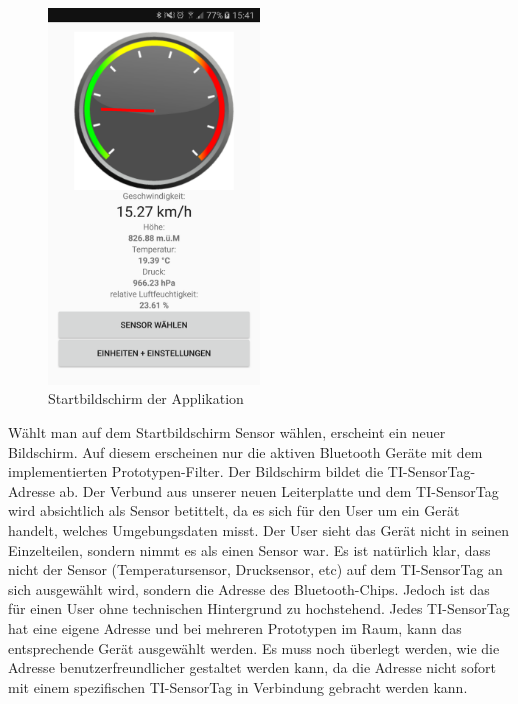 \begin{figure}[ht]
    \includegraphics[width=0.5\textwidth]{4Resultate/imag/APPHomeScreen.png} 
    \caption{Startbildschirm der Applikation}
    \label{tacho}
\end{figure}

Wählt man auf dem Startbildschirm \glqq Sensor wählen\grqq, erscheint ein neuer Bildschirm. Auf diesem erscheinen nur die aktiven Bluetooth Geräte mit dem implementierten Prototypen-Filter. Der Bildschirm bildet die TI-SensorTag-Adresse ab. Der Verbund aus unserer neuen Leiterplatte und dem TI-SensorTag wird absichtlich als Sensor betittelt, da es sich für den User um ein Gerät handelt, welches Umgebungsdaten misst. Der User sieht das Gerät nicht in seinen Einzelteilen, sondern nimmt es als einen Sensor war. Es ist natürlich klar, dass nicht der Sensor (Temperatursensor, Drucksensor, etc) auf dem TI-SensorTag an sich ausgewählt wird, sondern die Adresse des Bluetooth-Chips. Jedoch ist das für einen User ohne technischen Hintergrund zu hochstehend. Jedes TI-SensorTag hat eine eigene Adresse und bei mehreren Prototypen im Raum, kann das entsprechende Gerät ausgewählt werden. Es muss noch überlegt werden, wie die Adresse benutzerfreundlicher gestaltet werden kann, da die Adresse nicht sofort mit einem spezifischen TI-SensorTag in Verbindung gebracht werden kann.

